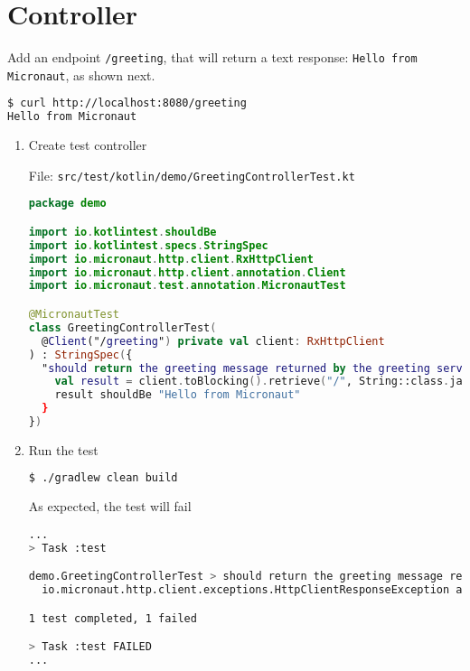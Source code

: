 \section{Controller}\label{sec:controller}

Add an endpoint \texttt{/greeting}, that will return a text response: \texttt{Hello from Micronaut}, as shown next.

\begin{lstlisting}[language=bash]
$ curl http://localhost:8080/greeting
Hello from Micronaut
\end{lstlisting}

\begin{enumerate}

\item  Create test controller

File: \texttt{src/test/kotlin/demo/GreetingControllerTest.kt}

\begin{lstlisting}[language=Kotlin]
package demo

import io.kotlintest.shouldBe
import io.kotlintest.specs.StringSpec
import io.micronaut.http.client.RxHttpClient
import io.micronaut.http.client.annotation.Client
import io.micronaut.test.annotation.MicronautTest

@MicronautTest
class GreetingControllerTest(
  @Client("/greeting") private val client: RxHttpClient
) : StringSpec({
  "should return the greeting message returned by the greeting service" {
    val result = client.toBlocking().retrieve("/", String::class.java)
    result shouldBe "Hello from Micronaut"
  }
})
\end{lstlisting}

\item Run the test

\begin{lstlisting}[language=bash]
$ ./gradlew clean build
\end{lstlisting}

As expected, the test will fail

\begin{lstlisting}[language=bash]
...
> Task :test

demo.GreetingControllerTest > should return the greeting message returned by the greeting service FAILED
  io.micronaut.http.client.exceptions.HttpClientResponseException at DefaultHttpClient.java:2030

1 test completed, 1 failed

> Task :test FAILED
...
\end{lstlisting}


\end{enumerate}
